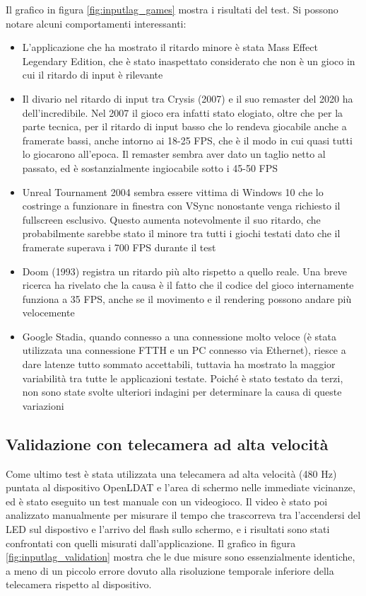 Il grafico in figura \ref{fig:inputlag_games} mostra i risultati del test. Si possono notare alcuni comportamenti interessanti: \begin{itemize}
	\item L'applicazione che ha mostrato il ritardo minore è stata Mass Effect Legendary Edition, che è stato inaspettato considerato che non è un gioco in cui il ritardo di input è rilevante
	\item Il divario nel ritardo di input tra Crysis (2007) e il suo remaster del 2020 ha dell'incredibile. Nel 2007 il gioco era infatti stato elogiato, oltre che per la parte tecnica, per il ritardo di input basso che lo rendeva giocabile anche a framerate bassi, anche intorno ai 18-25 FPS, che è il modo in cui quasi tutti lo giocarono all'epoca. Il remaster sembra aver dato un taglio netto al passato, ed è sostanzialmente ingiocabile sotto i 45-50 FPS
	\item Unreal Tournament 2004 sembra essere vittima di Windows 10 che lo costringe a funzionare in finestra con VSync nonostante venga richiesto il fullscreen esclusivo. Questo aumenta notevolmente il suo ritardo, che probabilmente sarebbe stato il minore tra tutti i giochi testati dato che il framerate superava i 700 FPS durante il test
	\item Doom (1993) registra un ritardo più alto rispetto a quello reale. Una breve ricerca ha rivelato che la causa è il fatto che il codice del gioco internamente funziona a 35 FPS, anche se il movimento e il rendering possono andare più velocemente
	\item Google Stadia, quando connesso a una connessione molto veloce (è stata utilizzata una connessione FTTH e un PC connesso via Ethernet), riesce a dare latenze tutto sommato accettabili, tuttavia ha mostrato la maggior variabilità tra tutte le applicazioni testate. Poiché è stato testato da terzi, non sono state svolte ulteriori indagini per determinare la causa di queste variazioni
\end{itemize}

\subsection{Validazione con telecamera ad alta velocità}
Come ultimo test è stata utilizzata una telecamera ad alta velocità (480 Hz) puntata al dispositivo OpenLDAT e l'area di schermo nelle immediate vicinanze, ed è stato eseguito un test manuale con un videogioco. Il video è stato poi analizzato manualmente per misurare il tempo che trascorreva tra l'accendersi del LED sul dispostivo e l'arrivo del flash sullo schermo, e i risultati sono stati confrontati con quelli misurati dall'applicazione. Il grafico in figura \ref{fig:inputlag_validation} mostra che le due misure sono essenzialmente identiche, a meno di un piccolo errore dovuto alla risoluzione temporale inferiore della telecamera rispetto al dispositivo.

